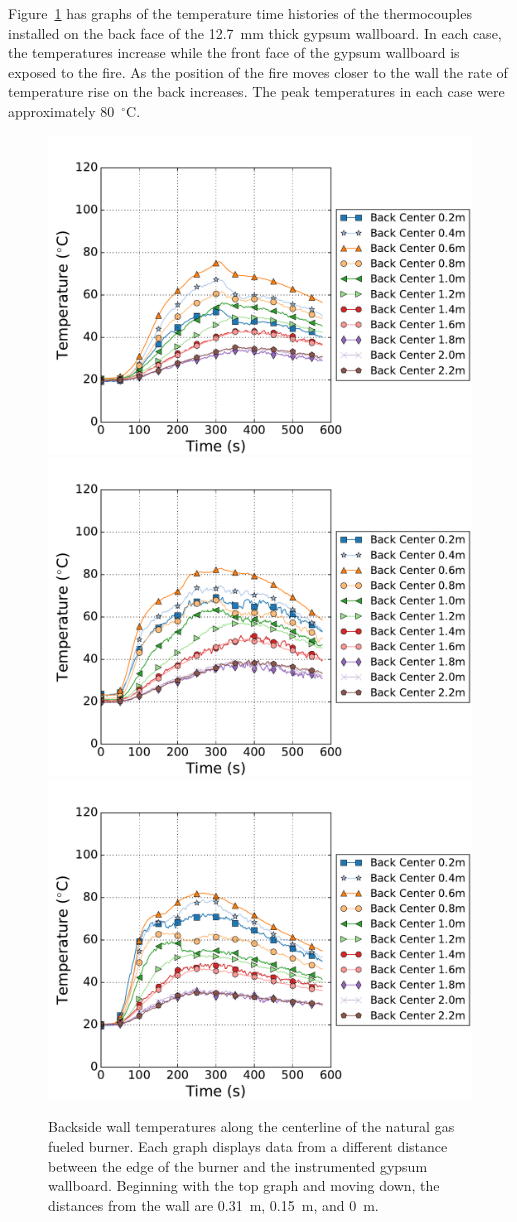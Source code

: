 \documentclass[twoside]{uocthesis}
\begin{document}
{Figure~\ref{IWGB_NG_TC_Backside_set} has graphs of the temperature time histories of the thermocouples installed on the back face of the 12.7~mm thick gypsum wallboard.  In each case, the temperatures increase while the front face of the gypsum wallboard is exposed to the fire.  As the position of the fire moves closer to the wall the rate of temperature rise on the back increases.  The peak temperatures in each case were approximately 80~$^\circ$C.   

\begin{figure}[ht!]
	\centering
	\includegraphics[width=.625\columnwidth]{../Figures/IWGBNG01_TC_Back_Center_Avg}\\
	\includegraphics[width=.625\columnwidth]{../Figures/IWGBNG04_TC_Back_Center_Avg}\\
	\includegraphics[width=.625\columnwidth]{../Figures/IWGBNG05_TC_Back_Center_Avg}\\
	\caption[Backside wall temperatures for the natural gas fueled burner]{Backside wall temperatures along the centerline of the natural gas fueled burner. Each graph displays data from a different distance between the edge of the burner and the instrumented gypsum wallboard.  Beginning with the top graph and moving down, the distances from the wall are 0.31~m, 0.15~m, and 0~m.}
	\label{IWGB_NG_TC_Backside_set}
\end{figure}

}
\end{document}
